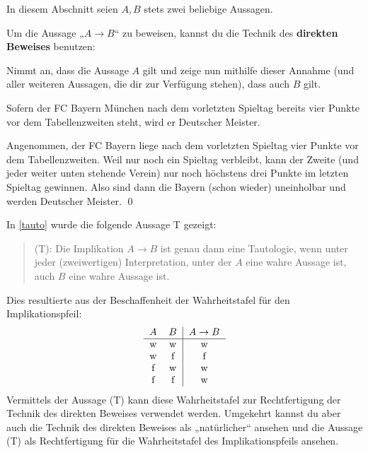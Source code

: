 In diesem Abschnitt seien $A,B$ stets zwei beliebige Aussagen.


\begin{axiom} \label{direkterbeweis} 
    Um die Aussage „$A\to B$“ zu beweisen, kannst du die Technik des \textbf{direkten Beweises} benutzen:
    
    Nimmt an, dass die Aussage $A$ gilt und zeige nun mithilfe dieser Annahme (und aller weiteren Aussagen, die dir zur Verfügung stehen), dass auch $B$ gilt.
\end{axiom}


\begin{bsp}
    Sofern der FC Bayern München nach dem vorletzten Spieltag bereits vier Punkte vor dem Tabellenzweiten steht, wird er Deutscher Meister.
\end{bsp}


\begin{bew}
    Angenommen, der FC Bayern liege nach dem vorletzten Spieltag vier Punkte vor dem Tabellenzweiten. Weil nur noch ein Spieltag verbleibt, kann der Zweite (und jeder weiter unten stehende Verein) nur noch höchstens drei Punkte im letzten Spieltag gewinnen. Also sind dann die Bayern (schon wieder) uneinholbar und werden Deutscher Meister. \qed
\end{bew}


\begin{bem}
    In \cref{tauto} wurde die folgende Aussage T gezeigt:
    \begin{quote}
        (T): Die Implikation $A\to B$ ist genau dann eine Tautologie, wenn unter jeder (zweiwertigen) Interpretation, unter der $A$ eine wahre Aussage ist, auch $B$ eine wahre Aussage ist.
    \end{quote}
    Dies resultierte aus der Beschaffenheit der Wahrheitstafel für den Implikationspfeil:
    \[\begin{tabular}{cc|c}
        $A$ & $B$ & $A\to B$ \\
        \hline
        w & w & w \\
        w & f & f \\
        f & w & w \\
        f & f & w
    \end{tabular}\]
    Vermittels der Aussage (T) kann diese Wahrheitstafel zur Rechtfertigung der Technik des direkten Beweises verwendet werden. Umgekehrt kannst du aber auch die Technik des direkten Beweises als „natürlicher“ ansehen und die Aussage (T) als Rechtfertigung für die Wahrheitstafel des Implikationspfeils ansehen.
\end{bem}
  
